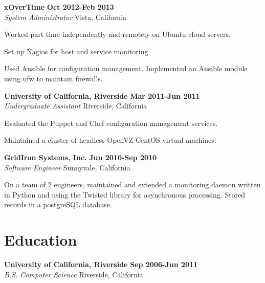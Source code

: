 \begin{lonelist}
\item[] \textbf{xOverTime} \hfill \textbf{Oct 2012-Feb 2013}\\
  \textit{System Administrator} \hfill Vista, California
  \begin{innerlist}
  \item Worked part-time independently and remotely on Ubuntu cloud servers.

  \item Set up Nagios for host and service monitoring.

  \item Used Ansible for configuration management. Implemented an Ansible
      module using ufw to maintain firewalls.
  \end{innerlist}

\item[] \textbf{University of California, Riverside} \hfill \textbf{Mar 2011-Jun 2011}\\
  \textit{Undergraduate Assistant} \hfill Riverside, California
  \begin{innerlist}
  \item Evaluated the Puppet and Chef configuration management services.

  \item Maintained a cluster of headless OpenVZ CentOS virtual machines.
  \end{innerlist}

\item[] \textbf{GridIron Systems, Inc.} \hfill \textbf{Jun 2010-Sep 2010}\\
  \textit{Software Engineer} \hfill Sunnyvale, California
  \begin{innerlist}
  \item On a team of 2 engineers, maintained and extended a monitoring daemon
      written in Python and using the Twisted library for asynchronous
      processing. Stored records in a postgreSQL database.
  \end{innerlist}

\end{lonelist}


\section{Education}
\textbf{University of California, Riverside} \hfill \textbf{Sep 2006-Jun 2011}\\
  \textit{B.S. Computer Science} \hfill Riverside, California
